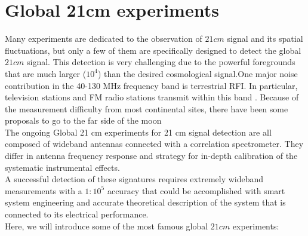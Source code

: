 \documentclass[12pt, TexShade, letterpaper]{report}
\begin{document}
\section{Global 21cm experiments}
Many experiments are dedicated to the observation of $21cm$ signal and its spatial fluctuations, but only a few of them are specifically designed to detect the global $21cm$ signal. This detection is very challenging due to the powerful foregrounds that are much larger ($10^4$) than the desired cosmological signal.One major noise contribution in the 40-130 MHz frequency band is terrestrial RFI. In particular, television stations and FM radio stations transmit within this band \cite{sci-hi_1}.
Because of the measurement difficulty from most continental sites, there have been some proposals to go to the far side of the moon\\
The ongoing Global 21 cm experiments for 21 cm signal detection are all composed of wideband antennas connected with a correlation spectrometer. They differ in antenna frequency response and strategy for in-depth calibration of the systematic instrumental effects. \cite{hyperion_1}\\
A successful detection of these signatures requires extremely wideband measurements with a $1:10^5$ accuracy that could be accomplished with smart system engineering and accurate theoretical description of the system that is connected to its electrical performance.\cite{hyperion_2}\\
Here, we will introduce some of the most famous global $21cm$ experiments:\par
\end{document}
